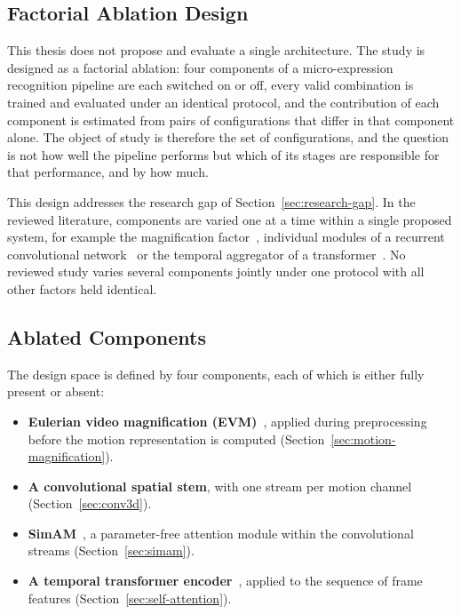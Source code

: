 \subsection{Factorial Ablation Design}
\label{sec:study-form}

This thesis does not propose and evaluate a single architecture. The study is designed as a factorial ablation: four components of a micro-expression recognition pipeline are each switched on or off, every valid combination is trained and evaluated under an identical protocol, and the contribution of each component is estimated from pairs of configurations that differ in that component alone. The object of study is therefore the set of configurations, and the question is not how well the pipeline performs but which of its stages are responsible for that performance, and by how much.

This design addresses the research gap of Section~\ref{sec:research-gap}. In the reviewed literature, components are varied one at a time within a single proposed system, for example the magnification factor~\cite{liX2018}, individual modules of a recurrent convolutional network~\cite{xia2020b} or the temporal aggregator of a transformer~\cite{zhang2022}. No reviewed study varies several components jointly under one protocol with all other factors held identical.

\subsection{Ablated Components}
\label{sec:four-variables}

The design space is defined by four components, each of which is either fully present or absent:

\begin{itemize}
	\item \textbf{Eulerian video magnification (EVM)}~\cite{wu2012}, applied during preprocessing before the motion representation is computed (Section~\ref{sec:motion-magnification}).
	\item \textbf{A convolutional spatial stem}, with one stream per motion channel (Section~\ref{sec:conv3d}).
	\item \textbf{SimAM}~\cite{yang2021}, a parameter-free attention module within the convolutional streams (Section~\ref{sec:simam}).
	\item \textbf{A temporal transformer encoder}~\cite{vaswani2017}, applied to the sequence of frame features (Section~\ref{sec:self-attention}).
\end{itemize}

